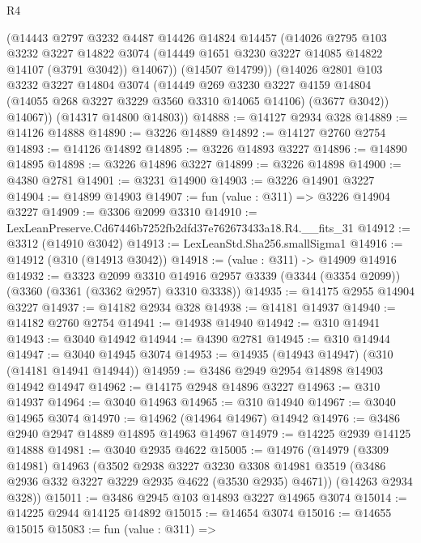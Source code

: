 \begin{lexlean}{R4}
\begin{coremodule}
          (@14443
            @2797
            @3232
            @4487
            @14426
            @14824
            @14457
            (@14026
              @2795
              @103
              @3232
              @3227
              @14822
              @3074
              (@14449 @1651 @3230 @3227 @14085 @14822 @14107 (@3791 @3042))
              @14067))
          (@14507 @14799))
        (@14026
          @2801
          @103
          @3232
          @3227
          @14804
          @3074
          (@14449
            @269
            @3230
            @3227
            @4159
            @14804
            (@14055 @268 @3227 @3229 @3560 @3310 @14065 @14106)
            (@3677 @3042))
          @14067))
      (@14317 @14800 @14803))
@14888 := @14127 @2934 @328
@14889 := @14126 @14888
@14890 := @3226 @14889
@14892 := @14127 @2760 @2754
@14893 := @14126 @14892
@14895 := @3226 @14893 @3227
@14896 := @14890 @14895
@14898 := @3226 @14896 @3227
@14899 := @3226 @14898
@14900 := @4380 @2781
@14901 := @3231 @14900
@14903 := @3226 @14901 @3227
@14904 := @14899 @14903
@14907 := fun (value : @311) => @3226 @14904 @3227
@14909 := @3306 @2099 @3310
@14910 := LexLeanPreserve.Cd67446b7252fb2dfd37e762673433a18.R4.__fits_31
@14912 := @3312 (@14910 @3042)
@14913 := LexLeanStd.Sha256.smallSigma1
@14916 := @14912 (@310 (@14913 @3042))
@14918 := (value : @311) -> @14909 @14916
@14932 := @3323
    @2099
    @3310
    @14916
    @2957
    @3339
    (@3344 (@3354 @2099))
    (@3360 (@3361 (@3362 @2957) @3310 @3338))
@14935 := @14175 @2955 @14904 @3227
@14937 := @14182 @2934 @328
@14938 := @14181 @14937
@14940 := @14182 @2760 @2754
@14941 := @14938 @14940
@14942 := @310 @14941
@14943 := @3040 @14942
@14944 := @4390 @2781
@14945 := @310 @14944
@14947 := @3040 @14945 @3074
@14953 := @14935 (@14943 @14947) (@310 (@14181 @14941 @14944))
@14959 := @3486 @2949 @2954 @14898 @14903 @14942 @14947
@14962 := @14175 @2948 @14896 @3227
@14963 := @310 @14937
@14964 := @3040 @14963
@14965 := @310 @14940
@14967 := @3040 @14965 @3074
@14970 := @14962 (@14964 @14967) @14942
@14976 := @3486 @2940 @2947 @14889 @14895 @14963 @14967
@14979 := @14225 @2939 @14125 @14888
@14981 := @3040 @2935 @4622
@15005 := @14976
    (@14979
      (@3309 @14981)
      @14963
      (@3502
        @2938
        @3227
        @3230
        @3308
        @14981
        @3519
        (@3486 @2936 @332 @3227 @3229 @2935 @4622 (@3530 @2935) @4671))
      (@14263 @2934 @328))
@15011 := @3486 @2945 @103 @14893 @3227 @14965 @3074
@15014 := @14225 @2944 @14125 @14892
@15015 := @14654 @3074
@15016 := @14655 @15015
@15083 := fun (value : @311) =>

\end{coremodule}
\end{lexlean}

